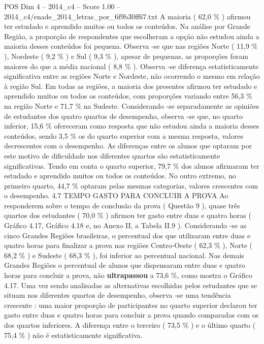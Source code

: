 \begin{textsample}{POS Dim 4 – 2014\_c4 – Score 1.00 – 2014\_c4/enade\_2014\_letras\_por\_6f9b30ff67.txt}
A maioria ( 62,0 \% ) afirmou ter estudado e aprendido muitos ou todos os conteúdos.
Na análise por Grande Região, a proporção de respondentes que escolheram a opção não estudou ainda a maioria desses conteúdos foi pequena.
Observa -se que nas regiões Norte ( 11,9 \% ), Nordeste ( 9,2 \% ) e Sul ( 9,3 \% ), apesar de pequenas, as proporções foram maiores do que a média nacional ( 8,8 \% ).
Observa -se diferença estatisticamente significativa entre as regiões Norte e Nordeste, não ocorrendo o mesmo em relação à região Sul.
Em todas as regiões, a maioria dos presentes afirmou ter estudado e aprendido muitos ou todos os conteúdos, com proporções variando entre 56,3 \% na região Norte e 71,7 \% na Sudeste.
Considerando -se separadamente as opiniões de estudantes dos quatro quartos de desempenho, observa -se que, no quarto inferior, 15,6 \% ofereceram como resposta que não estudou ainda a maioria desses conteúdos, sendo 3,5 \% os do quarto superior com a mesma resposta, valores decrescentes com o desempenho.
As diferenças entre os alunos que optaram por este motivo de dificuldade nos diferentes quartos são estatisticamente significativas.
Tendo em conta o quarto superior, 79,7 \% dos alunos afirmaram ter estudado e aprendido muitos ou todos os conteúdos.
No outro extremo, no primeiro quarto, 44,7 \% optaram pelas mesmas categorias, valores crescentes com o desempenho. 4.7 TEMPO GASTO PARA CONCLUIR A PROVA Ao responderem sobre o tempo de conclusão da prova ( Questão 9 ), quase três quartos dos estudantes ( 70,0 \% ) afirmou ter gasto entre duas e quatro horas ( Gráfico 4.17, Gráfico 4.18 e, no Anexo II, a Tabela II.9 ).
Considerando -se as cinco Grandes Regiões brasileiras, o percentual dos que utilizaram entre duas e quatro horas para finalizar a prova nas regiões Centro-Oeste ( 62,3 \% ), Norte ( 68,2 \% ) e Sudeste ( 68,3 \% ), foi inferior ao percentual nacional.
Nas demais Grandes Regiões o percentual de alunos que dispensaram entre duas e quatro horas para concluir a prova, não \textbf{ultrapassou} a 73,6 \%, como mostra o Gráfico 4.17.
Uma vez sendo analisadas as alternativas escolhidas pelos estudantes que se situam nos diferentes quartos de desempenho, observa -se uma tendência crescente : uma maior proporção de participantes no quarto superior declarou ter gasto entre duas e quatro horas para concluir a prova quando comparadas com os dos quartos inferiores.
A diferença entre o terceiro ( 73,5 \% ) e o último quarto ( 75,4 \% ) não é estatisticamente significativa.

\end{textsample}
